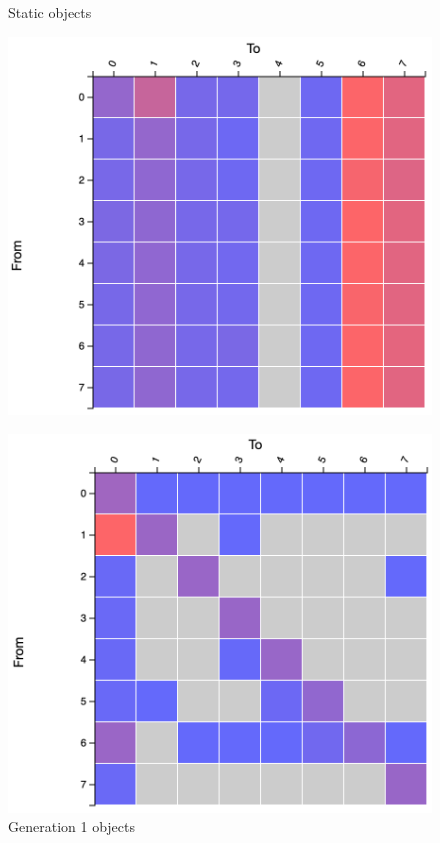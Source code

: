 \documentclass{paper}\usepackage{graphicx}
\begin{document}
\begin{figure}[!htb]
    \centering
    \begin{multicols}{3}
    \caption{Static objects}
    \label{fig:dpp_static}
    \includegraphics[width=\linewidth]{Paper/images/sumeuler/dp_static.png}\par
    \caption{Generation 1 objects}
    \label{fig:dp_gen1}
    \includegraphics[width=\linewidth]{Paper/images/sumeuler/dp_gen1.png}\par

\end{multicols}
\end{figure}
\end{document}
